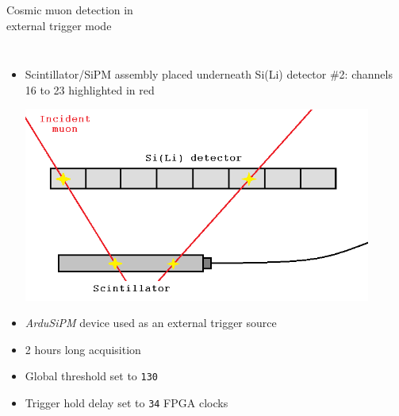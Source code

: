 \documentclass[aspectratio=169,xcolor=dvipsnames]{beamer}
\begin{document}
\begin{frame}{\vspace{-0.3cm} Cosmic muon detection in\\ \vskip-0.15cm external trigger mode}
    \addtolength{\leftmargini}{\labelsep}
    \fontsize{9pt}{1}\selectfont

    \begin{columns}
        \begin{itemize}
            \item Scintillator/SiPM assembly placed underneath Si(Li) detector \#2: channels 16 to 23 highlighted in red

            \vskip0.4cm
            \includegraphics[width=0.9\textwidth]{images/muon_detection/scintillator_sensor_detail.png}

            \vskip0.4cm
            \item \textit{ArduSiPM} device used as an external trigger source
            \item 2 hours long acquisition
            \item Global threshold set to \texttt{130}
            \item Trigger hold delay set to \texttt{34} FPGA clocks
            
        \end{itemize}


\end{columns}
\end{frame}
\end{document}

